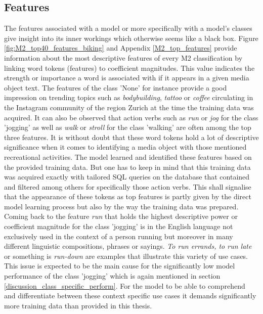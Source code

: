 \subsection{Features} \label{discussion_model_features}
The features associated with a model or more specifically with a model's classes give insight into its inner workings which otherwise seems like a black box. Figure \ref{fig:M2_top40_features_biking} and Appendix \ref{M2_top_features} provide information about the most descriptive features of every M2 classification by linking word tokens (features) to coefficient magnitudes. This value indicates the strength or importance a word is associated with if it appears in a given media object text. The features of the class 'None' for instance provide a good impression on trending topics such as \textit{bodybuilding}, \textit{tattoo} or \textit{coffee} circulating in the Instagram community of the region Zurich at the time the training data was acquired. It can also be observed that action verbs such as \textit{run} or \textit{jog} for the class 'jogging' as well as \textit{walk} or \textit{stroll} for the class 'walking' are often among the top three features. It is without doubt that these word tokens hold a lot of descriptive significance when it comes to identifying a media object with those mentioned recreational activities. The model learned and identified these features based on the provided training data. But one has to keep in mind that this training data was acquired exactly with tailored SQL queries on the database that contained and filtered among others for specifically those action verbs. This shall signalise that the appearance of these tokens as top features is partly given by the direct model learning process but also by the way the training data was prepared. \\ 

Coming back to the feature \textit{run} that holds the highest descriptive power or coefficient magnitude for the class 'jogging' is in the English language not exclusively used in the context of a person running but moreover in many different linguistic compositions, phrases or sayings. \textit{To run errands, to run late} or something is \textit{run-down} are examples that illustrate this variety of use cases. This issue is expected to be the main cause for the significantly low model performance of the class 'jogging' which is again mentioned in section \ref{discussion_class_specific_perform}. For the model to be able to comprehend and differentiate between these context specific use cases it demands significantly more training data than provided in this thesis. 


